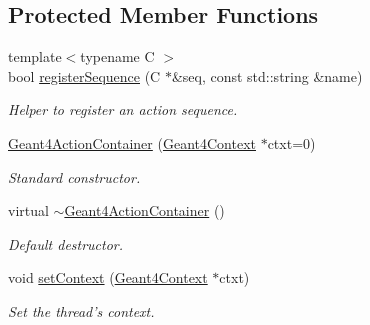 \subsection*{Protected Member Functions}
\begin{DoxyCompactItemize}
\item 
{\footnotesize template$<$typename C $>$ }\\bool \hyperlink{class_d_d4hep_1_1_simulation_1_1_geant4_action_container_ac655fa04c6d264d5d4bcf69c2fd4963e}{registerSequence} (C $\ast$\&seq, const std::string \&name)
\begin{DoxyCompactList}\small\item\em Helper to register an action sequence. \item\end{DoxyCompactList}\item 
\hyperlink{class_d_d4hep_1_1_simulation_1_1_geant4_action_container_aad45b121ff08648b1eaf84869ad33da7}{Geant4ActionContainer} (\hyperlink{class_d_d4hep_1_1_simulation_1_1_geant4_context}{Geant4Context} $\ast$ctxt=0)
\begin{DoxyCompactList}\small\item\em Standard constructor. \item\end{DoxyCompactList}\item 
virtual \hyperlink{class_d_d4hep_1_1_simulation_1_1_geant4_action_container_ab80f72eb6020b84e6ad03adfe9d7f61e}{$\sim$Geant4ActionContainer} ()
\begin{DoxyCompactList}\small\item\em Default destructor. \item\end{DoxyCompactList}\item 
void \hyperlink{class_d_d4hep_1_1_simulation_1_1_geant4_action_container_ae5f4903ca1043137f63f6b9054705b24}{setContext} (\hyperlink{class_d_d4hep_1_1_simulation_1_1_geant4_context}{Geant4Context} $\ast$ctxt)
\begin{DoxyCompactList}\small\item\em Set the thread's context. \item\end{DoxyCompactList}\end{DoxyCompactItemize}
